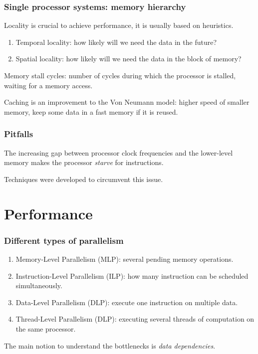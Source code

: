 \begin{frame}
  \frametitle{Single processor systems: memory hierarchy}

Locality is crucial to achieve performance, it is usually based on heuristics.

\begin{enumerate}
\item Temporal locality: how likely will we need the data in the future?
\item Spatial locality: how likely will we need the data in the block of memory?
\end{enumerate}

\medskip
Memory stall cycles: number of cycles during which the processor is stalled, waiting for a memory access.

\medskip
Caching is an improvement to the Von Neumann model: higher speed of smaller memory, keep some data in a fast memory if it is reused.
  
\end{frame}

\begin{frame}
  \frametitle{Pitfalls}

The increasing gap between processor clock frequencies and the lower-level memory makes the processor \textit{starve} for instructions.

\medskip
Techniques were developed to circumvent this issue.
\end{frame}

\section{Performance}


\begin{frame}[fragile]
  \frametitle{Different types of parallelism}

\begin{enumerate}
\item Memory-Level Parallelism (MLP): several pending memory operations.
\vspace{2ex}
\item Instruction-Level Parallelism (ILP): how many instruction can be scheduled simultaneously. 
\vspace{2ex}
\item Data-Level Parallelism (DLP): execute one instruction on multiple data.
\vspace{2ex}
\item Thread-Level Parallelism (DLP): executing several threads of computation on the same processor.
\end{enumerate}

\medskip
The main notion to understand the bottlenecks is \textit{data dependencies}.

\end{frame}

